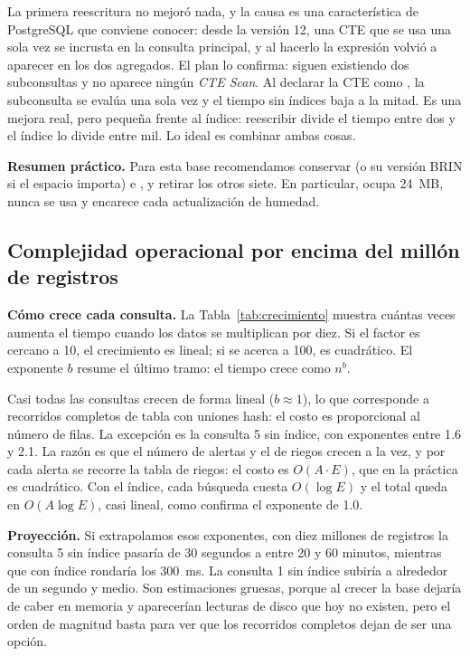 
La primera reescritura no mejoró nada, y la causa es una característica de PostgreSQL que conviene conocer: desde la versión 12, una CTE que se usa una sola vez se incrusta en la consulta principal, y al hacerlo la expresión  volvió a aparecer en los dos agregados. El plan lo confirma: siguen existiendo dos subconsultas y no aparece ningún \emph{CTE Scan}. Al declarar la CTE como , la subconsulta se evalúa una sola vez y el tiempo sin índices baja a la mitad. Es una mejora real, pero pequeña frente al índice: reescribir divide el tiempo entre dos y el índice lo divide entre mil. Lo ideal es combinar ambas cosas.


\textbf{Resumen práctico.} Para esta base recomendamos conservar  (o su versión BRIN si el espacio importa) e , y retirar los otros siete. En particular,  ocupa 24~MB, nunca se usa y encarece cada actualización de humedad.

\subsection{Complejidad operacional por encima del millón de registros}
\label{sec:extra}

\textbf{Cómo crece cada consulta.} La Tabla~\ref{tab:crecimiento} muestra cuántas veces aumenta el tiempo cuando los datos se multiplican por diez. Si el factor es cercano a 10, el crecimiento es lineal; si se acerca a 100, es cuadrático. El exponente $b$ resume el último tramo: el tiempo crece como $n^b$.


Casi todas las consultas crecen de forma lineal ($b \approx 1$), lo que corresponde a recorridos completos de tabla con uniones hash: el costo es proporcional al número de filas. La excepción es la consulta 5 sin índice, con exponentes entre 1.6 y 2.1. La razón es que el número de alertas y el de riegos crecen a la vez, y por cada alerta se recorre la tabla de riegos: el costo es $O(A \cdot E)$, que en la práctica es cuadrático. Con el índice, cada búsqueda cuesta $O(\log E)$ y el total queda en $O(A \log E)$, casi lineal, como confirma el exponente de 1.0.

\textbf{Proyección.} Si extrapolamos esos exponentes, con diez millones de registros la consulta 5 sin índice pasaría de 30 segundos a entre 20 y 60 minutos, mientras que con índice rondaría los 300~ms. La consulta 1 sin índice subiría a alrededor de un segundo y medio. Son estimaciones gruesas, porque al crecer la base dejaría de caber en memoria y aparecerían lecturas de disco que hoy no existen, pero el orden de magnitud basta para ver que los recorridos completos dejan de ser una opción.

